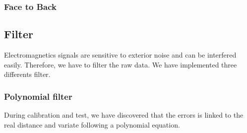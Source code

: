 \subsubsection{Face to Back}
\begin{figure}[H]
  \centering
  \begin{minipage}[c]{0.38\textwidth}
    \centering
    \resizebox{\linewidth}{!}{\FtB}
  \end{minipage}\hfill
  \begin{minipage}[c]{0.58\textwidth}
    \centering
    \footnotesize
    \setlength{\tabcolsep}{3pt}
  \end{minipage}
\end{figure}


\subsection{Filter}
Electromagnetics signals are sensitive to exterior noise and can be interfered easily. Therefore, we have to filter the raw data. We have implemented three differents filter.  
\subsubsection{Polynomial filter}
During calibration and test, we have discovered that the errors is linked to the real distance and variate following a polynomial equation.

